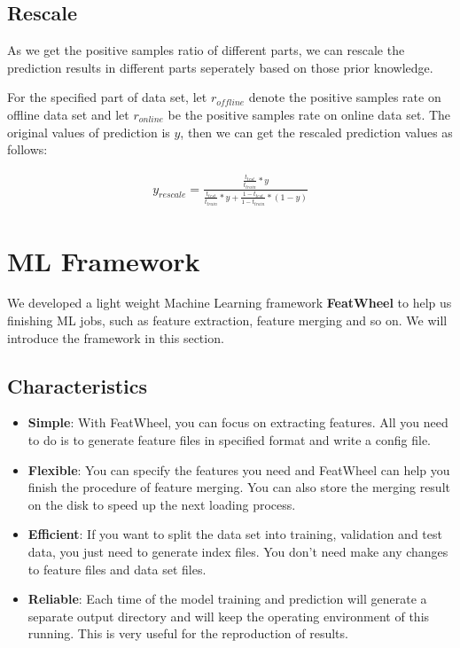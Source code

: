 \documentclass[12pt]{article}
\begin{document}
{{\subsection{Rescale}

As we get the positive samples ratio of different parts, we can rescale the prediction results in different parts seperately based on those prior knowledge.

For the specified part of data set, let $r_{offline}$ denote the positive samples rate on offline data set and let $r_{online}$ be the positive samples rate on online data set. The original values of prediction is $y$, then we can get the rescaled prediction values as follows:

\begin{eqnarray}
y_{rescale} = \frac{\frac{t_{test}}{t_{train}} * y}{\frac{t_{test}}{t_{train}} * y + \frac{1 - t_{test}}{1 - t_{train}} * (1 - y)}
\label{eqn:rescale_y}
\end{eqnarray}


\section{ML Framework}

We developed a light weight Machine Learning framework \textbf{FeatWheel} to help us finishing ML jobs, such as feature extraction, feature merging and so on. We will introduce the framework in this section.

\subsection{Characteristics}

\begin{itemize}
\label{list:characteristics}
\item \textbf{Simple}: With FeatWheel, you can focus on extracting features. All you need to do is to generate feature files in specified format and write a config file.
\item \textbf{Flexible}: You can specify the features you need and FeatWheel can help you finish the procedure of feature merging. You can also store the merging result on the disk to speed up the next loading process.
\item \textbf{Efficient}: If you want to split the data set into training, validation and test data, you just need to generate index files. You don't need make any changes to feature files and data set files.
\item \textbf{Reliable}: Each time of the model training and prediction will generate a separate output directory and will keep the operating environment of this running. This is very useful for the reproduction of results.
\end{itemize}

}}
\end{document}
